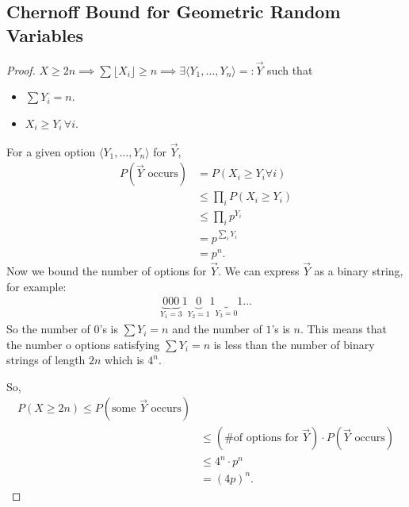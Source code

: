 \documentclass{report}
\begin{document}
\subsection{Chernoff Bound for Geometric Random Variables}
\begin{proof}
    $X \geq 2n \implies \sum \lfloor X_i \rfloor \geq n \implies \exists \langle Y_1, \ldots, Y_n\rangle =: \vec Y$ such that 
    \begin{itemize}
        \item $\sum Y_i  = n$.
        \item $X_i \geq Y_i \, \forall i$. 
    \end{itemize}
    For a given option $\langle Y_1, \ldots, Y_n\rangle$ for $\vec Y$,
    \begin{align*}
        P(\vec Y \text{ occurs}) &= P(X_i \geq Y_i \forall i) \\
        &\leq \prod_{i} P(X_i \geq Y_i) \\
        &\leq \prod_i p^{Y_i} \\
        &= p^{\sum_i Y_i} \\
        &= p^n.
    \end{align*}
    Now we bound the number of options for $\vec Y$. We can express $\vec Y$ as a binary string, for example:
    \begin{align*}
        \underbrace{000}_{Y_1 = 3}1\underbrace{0}_{Y_2=1} 1\underbrace{}_{Y_3 = 0}1 \ldots   
    \end{align*}
    So the number of $0$'s is $\sum Y_i = n$ and the number of $1$'s is $n$. This means that the number o options satisfying $\sum Y_i = n$ is less than the number of binary strings of length $2n$ which is $4^n$. 

    So,
    \begin{align*}
        P(X \geq 2n) \leq P(\text{some } \vec Y \text{ occurs}) \\
        &\leq (\text{\# of options for } \vec Y) \cdot P(\vec Y \text{ occurs}) \\
        &\leq 4^n \cdot p^n \\
        &= (4p)^n.
    \end{align*}
\end{proof}
\end{document}
